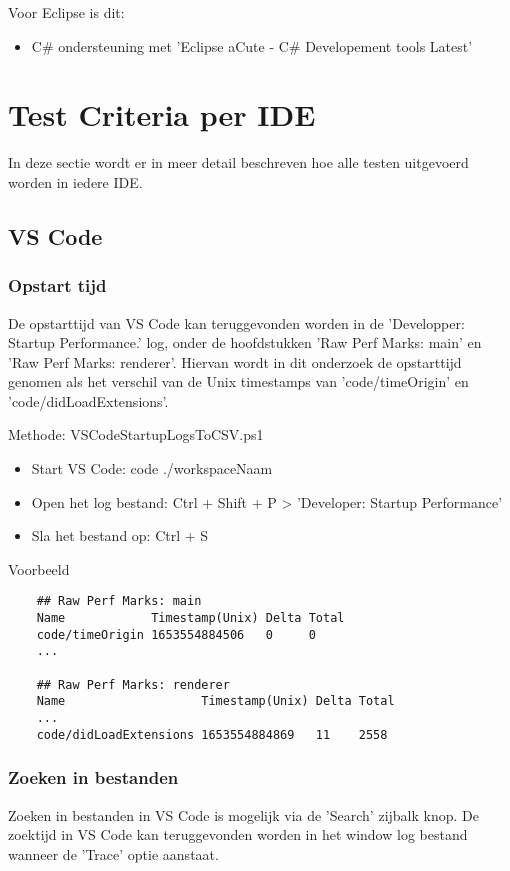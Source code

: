 Voor Eclipse is dit:
\begin{itemize}
	\item C\# ondersteuning met 'Eclipse aCute - C\# Developement tools Latest'
\end{itemize}

\section{Test Criteria per IDE}
In deze sectie wordt er in meer detail beschreven hoe alle testen uitgevoerd worden in iedere IDE.

\subsection{VS Code}
\subsubsection{Opstart tijd}
De opstarttijd van VS Code kan teruggevonden worden in de 'Developper: Startup Performance.' log, onder de hoofdstukken 'Raw Perf Marks: main' en 'Raw Perf Marks: renderer'. Hiervan wordt in dit onderzoek de opstarttijd genomen als het verschil van de Unix timestamps van 'code/timeOrigin' en 'code/didLoadExtensions'.

\newpage

Methode: VSCodeStartupLogsToCSV.ps1
\begin{itemize}
	\item Start VS Code: code ./workspaceNaam
	\item Open het log bestand: Ctrl + Shift + P > 'Developer: Startup Performance'
	\item Sla het bestand op: Ctrl + S
\end{itemize}

Voorbeeld
\vspace{\verbatimOffset}
\begin{verbatim}
    ## Raw Perf Marks: main
    Name            Timestamp(Unix) Delta Total
    code/timeOrigin 1653554884506   0     0
    ...
    
    ## Raw Perf Marks: renderer
    Name                   Timestamp(Unix) Delta Total
    ...
    code/didLoadExtensions 1653554884869   11    2558
\end{verbatim}

\subsubsection{Zoeken in bestanden}
Zoeken in bestanden in VS Code is mogelijk via de 'Search' zijbalk knop. De zoektijd in VS Code kan teruggevonden worden in het window log bestand wanneer de 'Trace' optie aanstaat.

